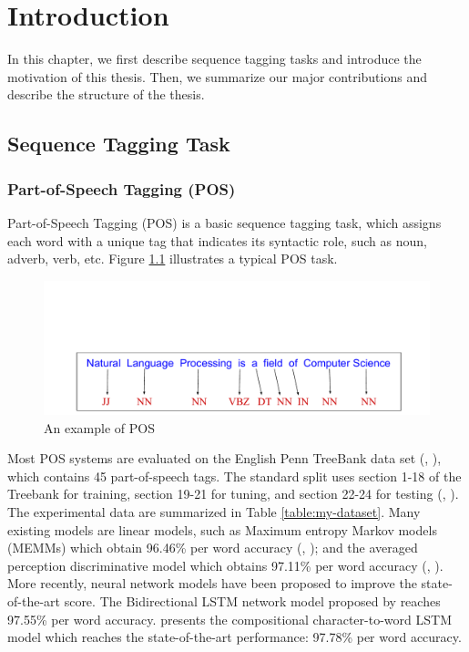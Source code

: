 \chapter{Introduction}

In this chapter, we first describe sequence tagging tasks and introduce the motivation of this thesis. Then, we summarize our major contributions and describe the structure of the thesis.

\section{Sequence Tagging Task}

\subsection{Part-of-Speech Tagging (POS)}
Part-of-Speech Tagging (POS) is a basic sequence tagging task, which assigns each word with a unique tag that indicates its syntactic role, such as noun, adverb, verb, etc. Figure \ref{fig:pos-ex} illustrates a typical POS task. 
\vspace{-2cm}
\begin{figure}[h]
  \centering
  \includegraphics[scale=0.6]{posex.pdf}
 \caption{An example of POS}
  \label{fig:pos-ex}
\end{figure}

Most POS systems are evaluated on the English Penn TreeBank data set (\citeauthor{marcus1993building}, \citeyear{marcus1993building}), which contains 45 part-of-speech tags. The standard split uses section 1-18 of the Treebank for training, section 19-21 for tuning, and section 22-24 for testing (\citeauthor{toutanova2003feature}, \citeyear{toutanova2003feature}). The experimental data are summarized in Table \ref{table:my-dataset}. Many existing models are linear models, such as Maximum entropy Markov models (MEMMs) which obtain 96.46\% per word accuracy (\citeauthor{mccallum2000maximum}, \citeyear{mccallum2000maximum}); and the averaged perception discriminative model which obtains 97.11\% per word accuracy (\citeauthor{collins2002discriminative}, \citeyear{collins2002discriminative}). More recently, neural network models have been proposed to improve the state-of-the-art score. The Bidirectional LSTM network model proposed by \cite{huang2015bidirectional} reaches 97.55\% per word accuracy. \cite{ling2015finding} presents the compositional character-to-word LSTM model which reaches the state-of-the-art performance: 97.78\% per word accuracy. 

